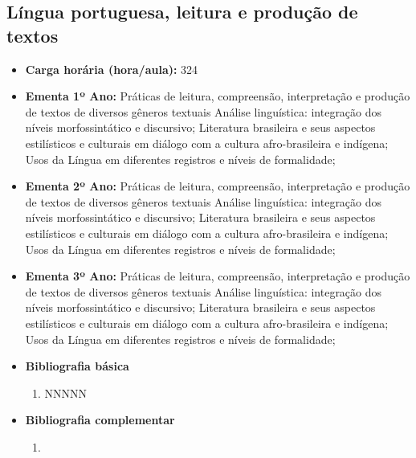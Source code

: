 \documentclass[11pt,fleqn]{book} %
\begin{document}
\subsection{Língua portuguesa, leitura e produção de textos}\label{disc:linguaportuguesa}
\begin{itemize}
	\item \textbf{Carga horária (hora/aula):} 324
	\item \textbf{Ementa 1º Ano:} 
	Práticas de leitura, compreensão, interpretação e produção de textos de diversos gêneros textuais
	Análise linguística: integração dos níveis morfossintático e discursivo;
	Literatura brasileira e seus aspectos estilísticos e culturais em diálogo com a cultura afro-brasileira e indígena;
	Usos da Língua em diferentes registros e níveis de formalidade;

	\item \textbf{Ementa 2º Ano:} 
	Práticas de leitura, compreensão, interpretação e produção de textos de diversos gêneros textuais
	Análise linguística: integração dos níveis morfossintático e discursivo;
	Literatura brasileira e seus aspectos estilísticos e culturais em diálogo com a cultura afro-brasileira e indígena;
	Usos da Língua em diferentes registros e níveis de formalidade;

	\item \textbf{Ementa 3º Ano:} 
	Práticas de leitura, compreensão, interpretação e produção de textos de diversos gêneros textuais
	Análise linguística: integração dos níveis morfossintático e discursivo;
	Literatura brasileira e seus aspectos estilísticos e culturais em diálogo com a cultura afro-brasileira e indígena;
	Usos da Língua em diferentes registros e níveis de formalidade;	
	
	\item \textbf{Bibliografia básica}
	\begin{enumerate}
		\item NNNNN
	\end{enumerate}
	\item \textbf{Bibliografia complementar}
	\begin{enumerate}
		\item 
	\end{enumerate}	
\end{itemize}
\end{document}
